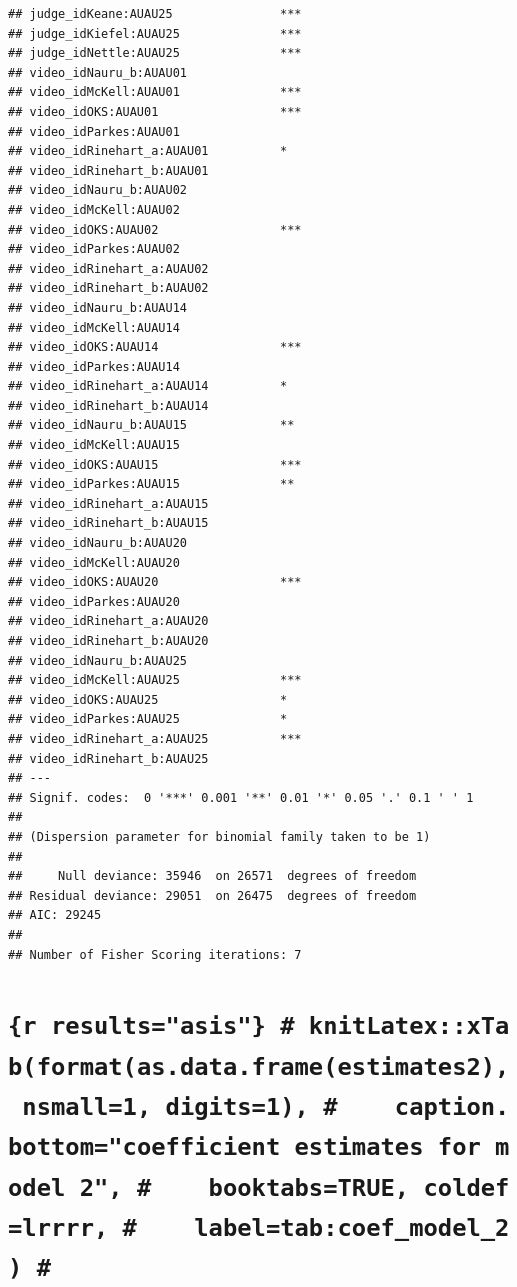 \documentclass{monashthesis}
\begin{document}
\begin{verbatim}
## judge_idKeane:AUAU25               ***
## judge_idKiefel:AUAU25              ***
## judge_idNettle:AUAU25              ***
## video_idNauru_b:AUAU01                
## video_idMcKell:AUAU01              ***
## video_idOKS:AUAU01                 ***
## video_idParkes:AUAU01                 
## video_idRinehart_a:AUAU01          *  
## video_idRinehart_b:AUAU01             
## video_idNauru_b:AUAU02                
## video_idMcKell:AUAU02                 
## video_idOKS:AUAU02                 ***
## video_idParkes:AUAU02                 
## video_idRinehart_a:AUAU02             
## video_idRinehart_b:AUAU02             
## video_idNauru_b:AUAU14                
## video_idMcKell:AUAU14                 
## video_idOKS:AUAU14                 ***
## video_idParkes:AUAU14                 
## video_idRinehart_a:AUAU14          *  
## video_idRinehart_b:AUAU14             
## video_idNauru_b:AUAU15             ** 
## video_idMcKell:AUAU15                 
## video_idOKS:AUAU15                 ***
## video_idParkes:AUAU15              ** 
## video_idRinehart_a:AUAU15             
## video_idRinehart_b:AUAU15             
## video_idNauru_b:AUAU20                
## video_idMcKell:AUAU20                 
## video_idOKS:AUAU20                 ***
## video_idParkes:AUAU20                 
## video_idRinehart_a:AUAU20             
## video_idRinehart_b:AUAU20             
## video_idNauru_b:AUAU25                
## video_idMcKell:AUAU25              ***
## video_idOKS:AUAU25                 *  
## video_idParkes:AUAU25              *  
## video_idRinehart_a:AUAU25          ***
## video_idRinehart_b:AUAU25             
## ---
## Signif. codes:  0 '***' 0.001 '**' 0.01 '*' 0.05 '.' 0.1 ' ' 1
## 
## (Dispersion parameter for binomial family taken to be 1)
## 
##     Null deviance: 35946  on 26571  degrees of freedom
## Residual deviance: 29051  on 26475  degrees of freedom
## AIC: 29245
## 
## Number of Fisher Scoring iterations: 7
\end{verbatim}

\hypertarget{r-resultsasis-knitlatexxtabformatas.data.frameestimates2-nsmall1-digits1-caption.bottomcoefficient-estimates-for-model-2-booktabstrue-coldeflrrrr-labeltabcoef_model_2}{%
\chapter{\texorpdfstring{\texttt{\{r\ results="asis"\}\ \#\ knitLatex::xTab(format(as.data.frame(estimates2),\ nsmall=1,\ digits=1),\ \#\ \ \ \ caption.bottom="coefficient\ estimates\ for\ model\ 2",\ \#\ \ \ \ booktabs=TRUE,\ coldef=\textquotesingle{}lrrrr\textquotesingle{},\ \#\ \ \ \ label=\textquotesingle{}tab:coef\_model\_2\textquotesingle{})\ \#}}{\{r results="asis"\} \# knitLatex::xTab(format(as.data.frame(estimates2), nsmall=1, digits=1), \#    caption.bottom="coefficient estimates for model 2", \#    booktabs=TRUE, coldef='lrrrr', \#    label='tab:coef\_model\_2') \#}}\label{r-resultsasis-knitlatexxtabformatas.data.frameestimates2-nsmall1-digits1-caption.bottomcoefficient-estimates-for-model-2-booktabstrue-coldeflrrrr-labeltabcoef_model_2}}
\end{document}
